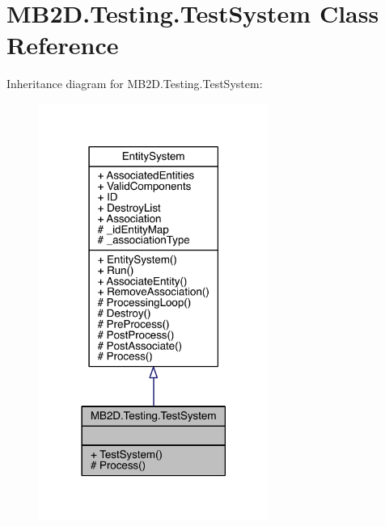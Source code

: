 \hypertarget{class_m_b2_d_1_1_testing_1_1_test_system}{}\section{M\+B2\+D.\+Testing.\+Test\+System Class Reference}
\label{class_m_b2_d_1_1_testing_1_1_test_system}


Inheritance diagram for M\+B2\+D.\+Testing.\+Test\+System\+:\nopagebreak
\begin{figure}[H]
\begin{center}
\leavevmode
\includegraphics[width=213pt]{class_m_b2_d_1_1_testing_1_1_test_system__inherit__graph}
\end{center}
\end{figure}


